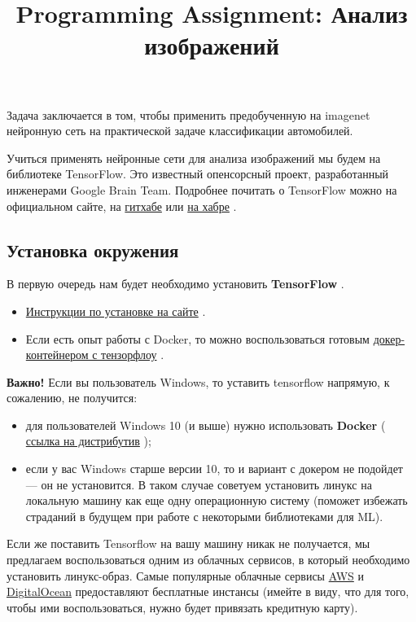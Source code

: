 \documentclass[11pt,a4paper]{article}
\title{Programming Assignment: Анализ изображений}
\begin{document}
\maketitle

Задача заключается в том, чтобы применить предобученную на imagenet нейронную сеть на практической задаче классификации автомобилей.

Учиться применять нейронные сети для анализа изображений мы будем на библиотеке TensorFlow. Это известный опенсорсный проект, разработанный инженерами Google Brain Team. Подробнее почитать о TensorFlow можно на официальном сайте, на \href{https://github.com/tensorflow/tensorflow}{гитхабе} или \href{https://habrahabr.ru/post/270543/}{на хабре} .

\subsection{Установка окружения}

В первую очередь нам будет необходимо установить \textbf{TensorFlow} .

\begin{itemize}
\item \href{https://www.tensorflow.org/versions/r0.10/get\_started/os\_setup.html\#download-and-setup}{Инструкции по установке на сайте} .
\item Если есть опыт работы с Docker, то можно воспользоваться готовым \href{https://www.tensorflow.org/versions/r0.10/get\_started/os\_setup.html\#docker-installation}{докер-контейнером с тензорфлоу} .
\end{itemize}

\textbf{Важно!} Если вы пользователь Windows, то уставить tensorflow напрямую, к сожалению, не получится:

\begin{itemize}
\item для пользователей Windows 10 (и выше) нужно использовать \textbf{Docker} ( \href{https://www.docker.com/products/docker\#/windows}{ссылка на дистрибутив} );
\item если у вас Windows старше версии 10, то и вариант с докером не подойдет — он не установится. В таком случае советуем установить линукс на локальную машину как еще одну операционную систему (поможет избежать страданий в будущем при работе с некоторыми библиотеками для ML).
\end{itemize}

Если же поставить Tensorflow на вашу машину никак не получается, мы предлагаем воспользоваться одним из облачных сервисов, в который необходимо установить линукс-образ. Самые популярные облачные сервисы \href{https://aws.amazon.com/}{AWS} и \href{http://digitalocean.com/}{DigitalOcean} предоставляют бесплатные инстансы (имейте в виду, что для того, чтобы ими воспользоваться, нужно будет привязать кредитную карту).
\end{document}
